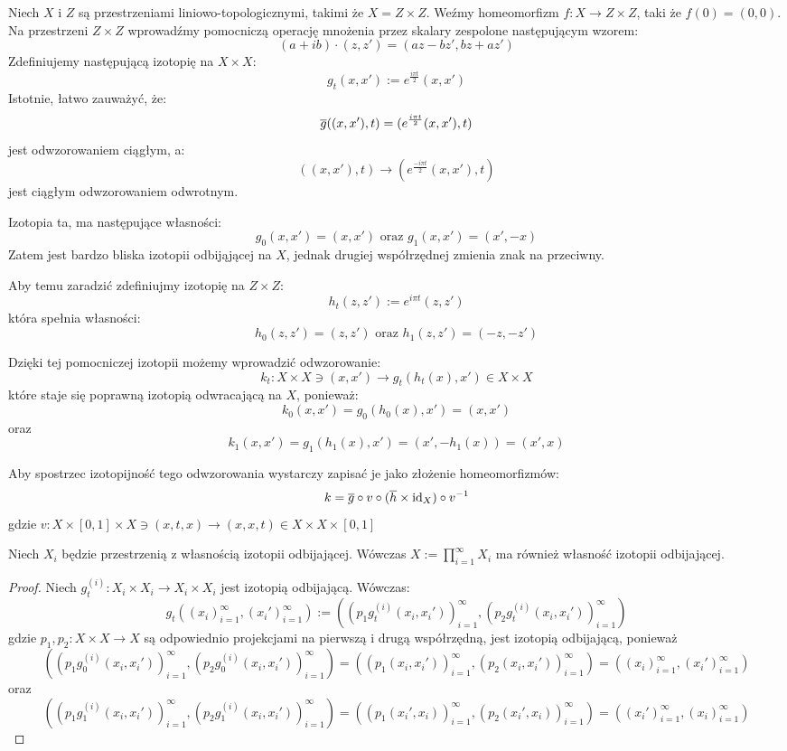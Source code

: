 \begin{ex} \label{rip-space}
  Niech $X$ i $Z$ są przestrzeniami liniowo-topologicznymi, takimi że $X = Z \times Z$. Weźmy homeomorfizm $f: X \rightarrow Z \times Z$, taki że $f(0) = (0,0)$. Na przestrzeni $Z \times Z$ wprowadźmy pomocniczą operację mnożenia przez skalary zespolone następującym wzorem:
  \[(a+ib) \cdot (z, z') = (az - bz', bz + az')\]
  Zdefiniujemy następującą izotopię na $X \times X$:
  \[g_t(x,x') := e^{\frac{i \pi t}{2}} (x, x')\]
  Istotnie, łatwo zauważyć, że:
  \[\overline{g}((x,x'), t) = (e^{\frac{i\pi t}{2}}(x,x'), t)\]
  jest odwzorowaniem ciągłym, a:
  \[((x,x'),t) \rightarrow (e^{\frac{-i\pi t}{2}}(x,x'),t)\]
  jest ciągłym odwzorowaniem odwrotnym.
  
  Izotopia ta, ma następujące własności:
  \[g_0(x,x') = (x,x') \mbox{ oraz } g_1(x,x') = (x', -x)\]
  Zatem jest bardzo bliska izotopii odbijąjącej na $X$, jednak drugiej współrzędnej zmienia znak na przeciwny.
  
  Aby temu zaradzić zdefiniujmy izotopię na $Z \times Z$:
  \[h_t(z,z') := e^{i \pi t}(z, z')\]
  która spełnia własności:
  \[h_0(z,z') = (z,z') \mbox{ oraz } h_1(z,z') = (-z,-z')\]
  
  Dzięki tej pomocniczej izotopii możemy wprowadzić odwzorowanie:
  \[k_t: X \times X \ni (x, x') \rightarrow g_t(h_t(x), x') \in X \times X\]
  które staje się poprawną izotopią odwracającą na $X$, ponieważ:
  \[k_0(x,x') = g_0(h_0(x), x') = (x, x')\]
  oraz
  \[k_1(x,x') = g_1(h_1(x), x') = (x', -h_1(x)) = (x', x)\]
  
  Aby spostrzec izotopijność tego odwzorowania wystarczy zapisać je jako złożenie homeomorfizmów:
  \[k = \overline{g} \circ v \circ (\overline{h} \times \mbox{id}_X) \circ v^{-1}\]
  gdzie $v: X \times [0,1] \times X \ni (x, t, x) \rightarrow (x, x, t) \in X \times X \times [0,1]$
\end{ex}

\begin{ex} \label{rip-product}
  Niech $X_i$ będzie przestrzenią z własnością izotopii odbijającej. Wówczas $X := \prod_{i=1}^\infty X_i$ ma również własność izotopii odbijającej.
  \begin{proof}
    Niech $g_t^{(i)}: X_i \times X_i \rightarrow X_i \times X_i$ jest izotopią odbijającą.
    Wówczas:
    \[g_t((x_i)_{i=1}^\infty, (x_i')_{i=1}^\infty) := ((p_1 g_t^{(i)}(x_i, x_i'))_{i=1}^\infty, (p_2 g_t^{(i)}(x_i, x_i'))_{i=1}^\infty)\]
    gdzie $p_1, p_2: X \times X \rightarrow X$ są odpowiednio projekcjami na pierwszą i drugą współrzędną, jest izotopią odbijającą, ponieważ
    \[((p_1 g_0^{(i)}(x_i, x_i'))_{i=1}^\infty, (p_2 g_0^{(i)}(x_i, x_i'))_{i=1}^\infty) = ((p_1 (x_i, x_i'))_{i=1}^\infty, (p_2 (x_i, x_i'))_{i=1}^\infty) = ((x_i)_{i=1}^\infty, (x_i')_{i=1}^\infty)\]
    oraz 
    \[((p_1 g_1^{(i)}(x_i, x_i'))_{i=1}^\infty, (p_2 g_1^{(i)}(x_i, x_i'))_{i=1}^\infty) = ((p_1 (x_i', x_i))_{i=1}^\infty, (p_2 (x_i', x_i))_{i=1}^\infty) = ((x_i')_{i=1}^\infty, (x_i)_{i=1}^\infty)\]
  \end{proof}
\end{ex}

